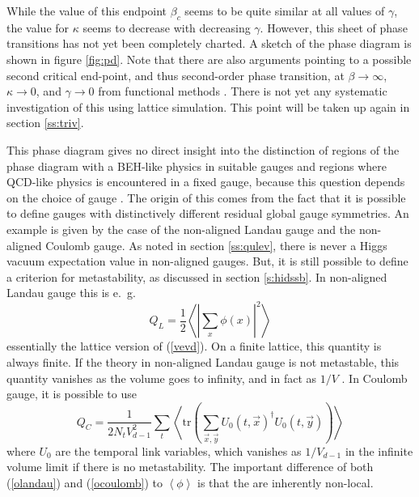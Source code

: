 \documentclass[final,twoside,12pt]{article}
\newcommand*{\no}{\noindent}
\newcommand*{\be}{\begin{equation}}
\newcommand*{\ee}{\end{equation}}
\newcommand*{\pref}[1]{(\ref{#1})}
\newcommand*{\tr}{\mathrm{tr}}
\newcommand*{\1}{1\!\!\!\bot}
\newcommand*{\la}{\left\langle}
\newcommand*{\ra}{\right\rangle}
\begin{document}
While the value of this endpoint $\beta_c$ seems to be quite similar at all values of $\gamma$, the value for $\kappa$ seems to decrease with decreasing $\gamma$. However, this sheet of phase transitions has not yet been completely charted. A sketch of the phase diagram is shown in figure \ref{fig:pd}. Note that there are also arguments pointing to a possible second critical end-point, and thus second-order phase transition, at $\beta\to\infty$, $\kappa\to 0$, and $\gamma\to 0$ from functional methods \cite{Gies:2015lia,Gies:2016kkk}. There is not yet any systematic investigation of this using lattice simulation. This point will be taken up again in section \ref{ss:triv}. 

This phase diagram gives no direct insight into the distinction of regions of the phase diagram with a BEH-like physics in suitable gauges and regions where QCD-like physics is encountered in a fixed gauge, because this question depends on the choice of gauge \cite{Caudy:2007sf}. The origin of this comes from the fact that it is possible to define gauges with distinctively different residual global gauge symmetries. An example is given by the case of the non-aligned Landau gauge and the non-aligned Coulomb gauge. As noted in section \ref{ss:qulev}, there is never a Higgs vacuum expectation value in non-aligned gauges. But, it is still possible to define a criterion for metastability, as discussed in section \ref{s:hidssb}. In non-aligned Landau gauge this is e.\ g.\ \cite{Caudy:2007sf,Langfeld:2002ic}
\be
Q_L=\frac{1}{2}\la\left|\sum_x\phi(x)\right|^2\ra\label{olandau}
\ee
\no essentially the lattice version of \pref{vevd}. On a finite lattice, this quantity is always finite. If the theory in non-aligned Landau gauge is not metastable, this quantity vanishes as the volume goes to infinity, and in fact as $1/V$ \cite{Caudy:2007sf,Maas:2012ct}. In Coulomb gauge, it is possible to use \cite{Caudy:2007sf,Greensite:2003xf}
\be
Q_C=\frac{1}{2N_tV_{d-1}^2}\sum_t\la\tr\left(\sum_{\vec x,\vec y}U_0(t,\vec x)^\dagger U_0(t,\vec y)\right)\ra\label{ocoulomb}
\ee
\no where $U_0$ are the temporal link variables, which vanishes as $1/V_{d-1}$ in the infinite volume limit if there is no metastability. The important difference of both \pref{olandau} and \pref{ocoulomb} to $\la \phi\ra$ is that the are inherently non-local.
\end{document}
